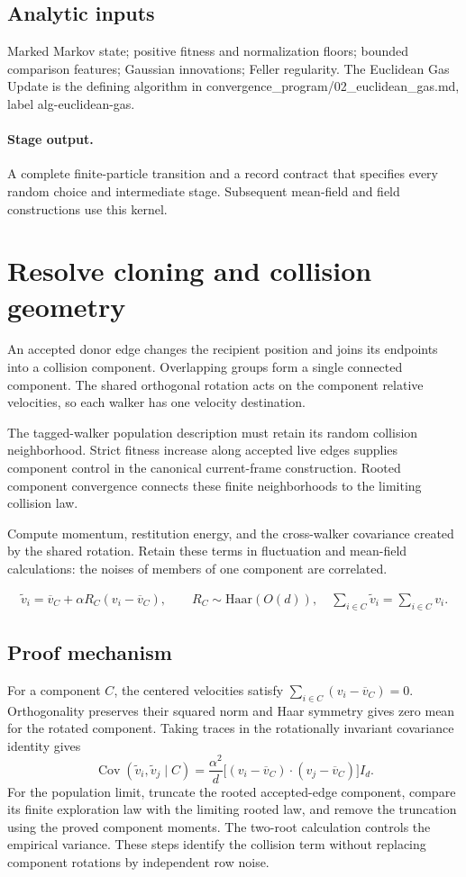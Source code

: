 \documentclass[11pt,a4paper]{article}
\begin{document}
\subsection*{Analytic inputs}
Marked Markov state; positive fitness and normalization floors; bounded comparison features; Gaussian innovations; Feller regularity. The Euclidean Gas Update is the defining algorithm in convergence\_program/02\_euclidean\_gas.md, label alg-euclidean-gas.
\paragraph{Stage output.} A complete finite-particle transition and a record contract that specifies every random choice and intermediate stage. Subsequent mean-field and field constructions use this kernel.

\section{Resolve cloning and collision geometry}
\label{stage:2}
An accepted donor edge changes the recipient position and joins its endpoints into a collision component. Overlapping groups form a single connected component. The shared orthogonal rotation acts on the component relative velocities, so each walker has one velocity destination.

The tagged-walker population description must retain its random collision neighborhood. Strict fitness increase along accepted live edges supplies component control in the canonical current-frame construction. Rooted component convergence connects these finite neighborhoods to the limiting collision law.

Compute momentum, restitution energy, and the cross-walker covariance created by the shared rotation. Retain these terms in fluctuation and mean-field calculations: the noises of members of one component are correlated.


\begin{gather*}
\widetilde v_i=\overline v_C+\alpha R_C(v_i-\overline v_C),\qquad R_C\sim\mathrm{Haar}(O(d)),
\quad \sum_{i\in C}\widetilde v_i=\sum_{i\in C}v_i.
\end{gather*}
\subsection*{Proof mechanism}
For a component \(C\), the centered velocities satisfy \(\sum_{i\in C}(v_i-\overline v_C)=0\). Orthogonality preserves their squared norm and Haar symmetry gives zero mean for the rotated component. Taking traces in the rotationally invariant covariance identity gives
\[\operatorname{Cov}(\widetilde v_i,\widetilde v_j\mid C)
=\frac{\alpha^2}{d}\bigl[(v_i-\overline v_C)\cdot(v_j-\overline v_C)\bigr]I_d.\]
For the population limit, truncate the rooted accepted-edge component, compare its finite exploration law with the limiting rooted law, and remove the truncation using the proved component moments. The two-root calculation controls the empirical variance. These steps identify the collision term without replacing component rotations by independent row noise.
\end{document}
